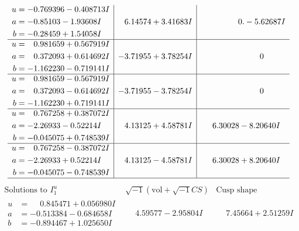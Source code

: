 \documentclass[1p]{elsarticle_modified}
\theoremstyle{definition}
\newcommand{\I}{\sqrt{-1}}
\begin{document}
$$\begin{array}{c|c|c}
\begin{aligned}
u &= -0.769396 - 0.408713 I \\
a &= -0.85103 - 1.93608 I \\
b &= -0.28459 + 1.54058 I\end{aligned}
 & \phantom{-}6.14574 + 3.41683 I & \phantom{-0.000000 } 0. - 5.62687 I \\ \hline\begin{aligned}
u &= \phantom{-}0.981659 + 0.567919 I \\
a &= \phantom{-}0.372093 + 0.614692 I \\
b &= -1.162230 - 0.719141 I\end{aligned}
 & -3.71955 + 3.78254 I & \phantom{-0.000000 } 0 \\ \hline\begin{aligned}
u &= \phantom{-}0.981659 - 0.567919 I \\
a &= \phantom{-}0.372093 - 0.614692 I \\
b &= -1.162230 + 0.719141 I\end{aligned}
 & -3.71955 - 3.78254 I & \phantom{-0.000000 } 0 \\ \hline\begin{aligned}
u &= \phantom{-}0.767258 + 0.387072 I \\
a &= -2.26933 - 0.52214 I \\
b &= -0.045075 + 0.748539 I\end{aligned}
 & \phantom{-}4.13125 + 4.58781 I & \phantom{-}6.30028 - 8.20640 I \\ \hline\begin{aligned}
u &= \phantom{-}0.767258 - 0.387072 I \\
a &= -2.26933 + 0.52214 I \\
b &= -0.045075 - 0.748539 I\end{aligned}
 & \phantom{-}4.13125 - 4.58781 I & \phantom{-}6.30028 + 8.20640 I\\
 \hline 
 \end{array}$$\newpage$$\begin{array}{c|c|c}  
\text{Solutions to }I^u_{1}& \I (\text{vol} + \sqrt{-1}CS) & \text{Cusp shape}\\
 \hline 
\begin{aligned}
u &= \phantom{-}0.845471 + 0.056980 I \\
a &= -0.513384 - 0.684658 I \\
b &= -0.894467 + 1.025650 I\end{aligned}
 & \phantom{-}4.59577 - 2.95804 I & \phantom{-}7.45664 + 2.51259 I \\ \hline\begin{aligned}

\end{aligned}
\end{array}$$
\end{document}
